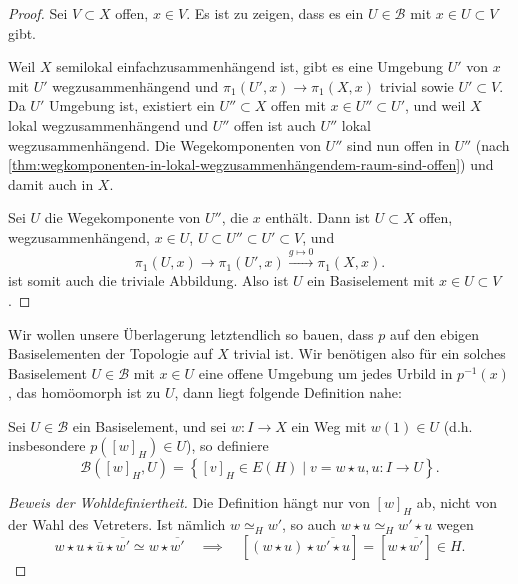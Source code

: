 \begin{proof}
    Sei $V\subset X$ offen, $x\in V$. Es ist zu zeigen, dass es ein $U\in \mathcal{B}$ mit $x\in U\subset V$ gibt. 

    Weil $X$ semilokal einfachzusammenhängend ist, gibt es eine Umgebung  $U'$ von  $x$ mit  $U'$ wegzusammenhängend und $\pi_1(U',x) \to  \pi_1(X,x)$ trivial sowie $U'\subset V$. Da $U'$ Umgebung ist, existiert ein  $U''\subset X$ offen mit $x\in U'' \subset U'$, und weil $X$ lokal wegzusammenhängend und  $U''$ offen ist auch  $U''$ lokal wegzusammenhängend. Die Wegekomponenten von  $U''$ sind nun offen in  $U''$ (nach  \autoref{thm:wegkomponenten-in-lokal-wegzusammenhängendem-raum-sind-offen}) und damit auch in $X$. 

    Sei $U$ die Wegekomponente von  $U''$, die  $x$ enthält. Dann ist  $U\subset X$ offen, wegzusammenhängend, $x\in U$, $U\subset U''\subset U'\subset V$, und
    \[
        \pi_1(U,x) \to  \pi_1(U',x) \stackrel{g \mapsto 0}{\longrightarrow}   \pi_1(X,x)
    .\] 
    ist somit auch die triviale Abbildung. Also ist $U$ ein Basiselement mit $x\in U\subset V$.
\end{proof}


Wir wollen unsere Überlagerung letztendlich so bauen, dass $p$ auf den ebigen Basiselementen der Topologie auf $X$ trivial ist. Wir benötigen also für ein solches Basiselement  $U\in \mathcal{B}$ mit $x\in U$ eine offene Umgebung um jedes Urbild in $p^{-1} (x)$, das homöomorph ist zu $U$, dann liegt folgende Definition nahe:

\begin{dlemmadef}\label{def:offene-mengen-in-universeller-überlagerung}
    Sei $U\in \mathcal{B}$ ein Basiselement, und sei $w\colon  I \to  X$ ein Weg mit $w(1) \in U$ (d.h. insbesondere $p([w]_H) \in U$), so definiere
\[
    \mathcal{B}([w]_H,U) = \left \{[v]_H \in E(H) \mid v = w \star u, u\colon I\to U\right\}  
.\]
\end{dlemmadef}

\begin{proof}[Beweis der Wohldefiniertheit]
    Die Definition hängt nur von $[w]_H$ ab, nicht von der Wahl des Vetreters. Ist nämlich  $w \simeq_H w'$, so auch  $w \star u \simeq_H w' \star u$ wegen
     \[
         w \star u \star \overline{u} \star \overline{w'} \simeq w \star \overline{w'} \quad \implies\quad [(w \star u) \star\overline{w' \star u}] = [w \star \overline{w'}] \in H
    .\] 
\end{proof}

